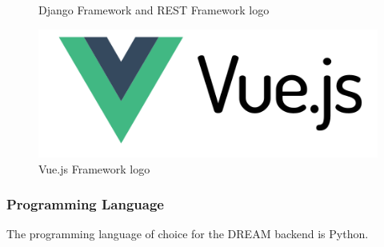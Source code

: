 \documentclass[table, 12pt]{article}
\begin{document}
\begin{figure}[H]
    \qquad
    \caption{Django Framework and REST Framework logo}
\end{figure}
\begin{center}
    \begin{figure}[H]
        \includegraphics[scale=0.65, center]{assets/Vue-Logo.png}
        \caption{Vue.js Framework logo}
        \label{fig: vue_logo}
    \end{figure}
\end{center}

\subsubsection{Programming Language}
The programming language of choice for the DREAM backend is Python.
\end{document}
